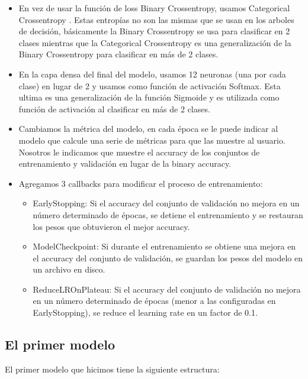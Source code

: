 \documentclass[12pt, titlepage, a4paper]{article}
\begin{document}
\begin{itemize}
    \item En vez de usar la función de loss Binary Crossentropy, usamos Categorical Crossentropy \cite{CategoricalCrossentropy}. Estas entropías no son las mismas que se usan en los arboles de decisión, básicamente la Binary Crossentropy se usa para clasificar en 2 clases mientras que la Categorical Crossentropy es una generalización de la Binary Crossentropy para clasificar en más de 2 clases.
    \item En la capa densa del final del modelo, usamos 12 neuronas (una por cada clase) en lugar de 2 y usamos como función de activación Softmax. Esta ultima es una generalización de la función Sigmoide y es utilizada como función de activación al clasificar en más de 2 clases.
    \item Cambiamos la métrica del modelo, en cada época se le puede indicar al modelo que calcule una serie de métricas para que las muestre al usuario. Nosotros le indicamos que muestre el accuracy de los conjuntos de entrenamiento y validación en lugar de la binary accuracy.
    \item Agregamos 3 callbacks para modificar el proceso de entrenamiento:
    \begin{itemize}
        \item EarlyStopping: Si el accuracy del conjunto de validación no mejora en un número determinado de épocas, se detiene el entrenamiento y se restauran los pesos que obtuvieron el mejor accuracy.
        \item ModelCheckpoint: Si durante el entrenamiento se obtiene una mejora en el accuracy del conjunto de validación, se guardan los pesos del modelo en un archivo en disco.
        \item ReduceLROnPlateau: Si el accuracy del conjunto de validación no mejora en un número determinado de épocas (menor a las configuradas en EarlyStopping), se reduce el learning rate en un factor de 0.1.
    \end{itemize}
\end{itemize}
 
\subsection{El primer modelo}
\noindent El primer modelo que hicimos tiene la siguiente estructura:
\end{document}

